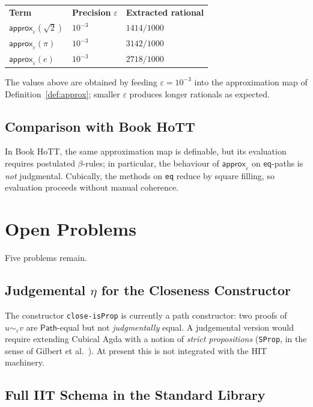 \documentclass[12pt]{article}
\theoremstyle{definition}
\theoremstyle{remark}
\newcommand{\Path}{\mathsf{Path}}
\newcommand{\close}{\mathrel{\sim}}
\begin{document}
\begin{center}
\begin{tabular}{lll}
\textbf{Term} & \textbf{Precision} $\varepsilon$ & \textbf{Extracted rational} \\
$\mathsf{approx}_{\varepsilon}(\sqrt{2})$ & $10^{-3}$ & $1414/1000$ \\
$\mathsf{approx}_{\varepsilon}(\pi)$ & $10^{-3}$ & $3142/1000$ \\
$\mathsf{approx}_{\varepsilon}(e)$ & $10^{-3}$ & $2718/1000$ \\
\end{tabular}
\end{center}

The values above are obtained by feeding $\varepsilon = 10^{-3}$ into
the approximation map of Definition~\ref{def:approx}; smaller
$\varepsilon$ produces longer rationals as expected.

\subsection{Comparison with Book HoTT}

In Book HoTT, the same approximation map is definable, but its
evaluation requires postulated $\beta$-rules; in particular, the
behaviour of $\mathsf{approx}_\varepsilon$ on $\mathsf{eq}$-paths is
\emph{not} judgmental. Cubically, the methods on \texttt{eq} reduce by
square filling, so evaluation proceeds without manual coherence.

\section{Open Problems}
\label{sec:open}

Five problems remain.

\subsection{Judgemental \texorpdfstring{$\eta$}{eta} for the Closeness Constructor}

The constructor \texttt{close-isProp} is currently a path constructor:
two proofs of $u \close_\varepsilon v$ are $\Path$-equal but not
\emph{judgmentally} equal. A judgemental version would require
extending Cubical Agda with a notion of \emph{strict propositions}
(\texttt{SProp}, in the sense of Gilbert et al.\ \cite{SProp}). At
present this is not integrated with the HIT machinery.

\subsection{Full IIT Schema in the Standard Library}
\end{document}
